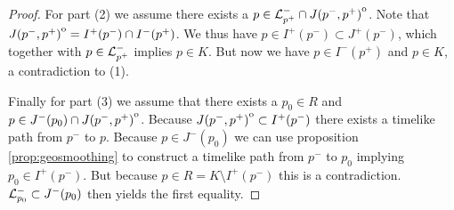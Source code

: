 \begin{proof}

For part (2) we assume there exists a $p\in {\mathcal{L}}^-_{p^+}\cap {\kern0ptJ(p^-,p^+)}^{\mathrm{o}}$. Note that ${\kern0ptJ(p^-,p^+)}^{\mathrm{o}}=I^+(p^-)\cap I^-(p^+)$. We thus have $p\in I^+(p^-)\subset J^+(p^-)$, which together with $p\in {\mathcal{L}}^-_{p^+}$ implies $p\in K$. But now we have $p\in I^-(p^+)$ and $p\in K$, a contradiction to (1).

Finally for part (3) we assume that there exists a $p_0\in R$ and $p\in J^-(p_0)\cap {\kern0ptJ(p^-,p^+)}^{\mathrm{o}}$. Because ${\kern0ptJ(p^-,p^+)}^{\mathrm{o}}\subset I^+(p^-)$ there exists a timelike path from $p^-$ to $p$. Because $p\in J^-(p_0)$ we can use proposition \ref{prop:geosmoothing} to construct a timelike path from $p^-$ to $p_0$ implying $p_0\in I^+(p^-)$. But because $p\in R=K\setminus I^+(p^-)$ this is a contradiction. ${\mathcal{L}}^-_{p_0} \subset J^-(p_0)$ then yields the first equality.
\end{proof}



